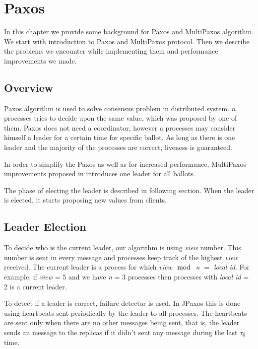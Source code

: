 \chapter{Paxos}

In this chapter we provide some background for Paxos and MultiPaxos algorithm. We start with introduction to Paxos and MultiPaxos protocol. Then we describe the problems we encounter while implementing them and performance improvements we made.

\section{Overview}
Paxos algorithm is used to solve consensus problem in distributed system. $n$ processes tries to decide upon the same value, which was proposed by one of them. Paxos does not need a coordinator, however a processes may consider himself a leader for a certain time for specific ballot. As long as there is one leader and the majority of the processes are correct, liveness is guaranteed.

In order to simplify the Paxos as well as for increased performance, MultiPaxos improvements proposed in \cite{Lam01} introduces one leader for all ballots.

The phase of electing the leader is described in following section. When the leader is elected, it starts proposing new values from clients.

\section{Leader Election}
\label{sec:leader_election}
\indent\par

To decide who is the current leader, our algorithm is using \textit{view} number. This number is sent in every message and processes keep track of the highest \textit{view} received. The current leader is a process for which \textit{view $\mod$ n $=$ local id}. For example, if \textit{view} = 5 and we have \textit{n} = 3 processes then processes with \textit{local id} = 2 is a current leader.

To detect if a leader is correct, failure detector is used. In JPaxos this is done using heartbeats sent periodically by the leader to all processes. The heartbeats are sent only when there are no other messages being sent, that is, the leader sends an \alive message to the replicas if it didn't sent any message during the last $\tau_0$ time.

